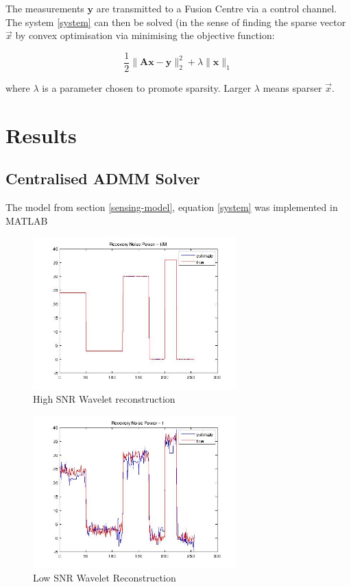 \documentclass{article}
\begin{document}
The measurements \(\textbf{y}\) are transmitted to a Fusion Centre via a control channel. The system  \ref{system} can then be solved (in the sense of finding the sparse vector \(\vec{x}\) by convex optimisation via minimising the objective function:

\begin{equation}
\frac{1}{2}\|\textbf{Ax}-\textbf{y}\|_2^2 + \lambda \|\textbf{x}\|_1
\end{equation}

where \(\lambda\) is a parameter chosen to promote sparsity. Larger \(\lambda\) means sparser \(\vec{x}\).

\section{Results}

\subsection{Centralised ADMM Solver}
The model from section \ref{sensing-model}, equation \ref{system} was implemented in MATLAB 

\begin{figure}[h]
\centering
\includegraphics[width=0.7\textwidth]{recovery_vhigh_snr.jpg}
\caption{High SNR Wavelet reconstruction}
\end{figure}

\begin{figure}[h]
\centering
\includegraphics[width=0.7\textwidth]{recovery_low_snr.jpg}
\caption{Low SNR Wavelet Reconstruction }
\end{figure}
\end{document}
